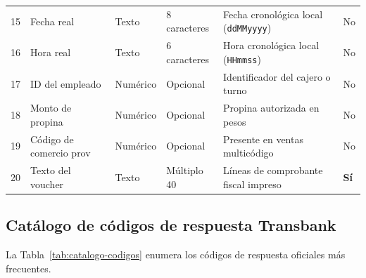 \documentclass{../../plantilla/raysac-informe}
\begin{document}
\begin{longtable}{@{}p{0.8cm}p{4.2cm}p{1.8cm}p{1.8cm}p{4.6cm}p{1.4cm}@{}}
15 & Fecha real & Texto & 8 caracteres & Fecha cronológica local (\texttt{ddMMyyyy}) & No \\
16 & Hora real & Texto & 6 caracteres & Hora cronológica local (\texttt{HHmmss}) & No \\
17 & ID del empleado & Numérico & Opcional & Identificador del cajero o turno & No \\
18 & Monto de propina & Numérico & Opcional & Propina autorizada en pesos & No \\
19 & Código de comercio prov & Numérico & Opcional & Presente en ventas multicódigo & No \\
20 & Texto del voucher & Texto & Múltiplo 40 & Líneas de comprobante fiscal impreso & \textbf{Sí} \\
\end{longtable}

\subsection{Catálogo de códigos de respuesta Transbank}
La Tabla~\ref{tab:catalogo-codigos} enumera los códigos de respuesta oficiales más frecuentes.
\end{document}
